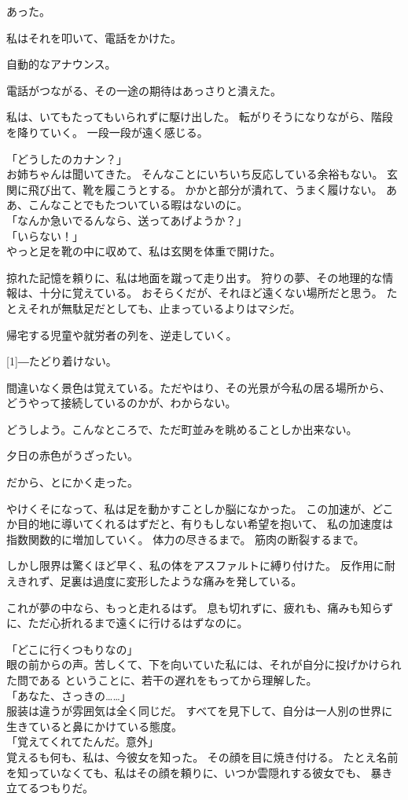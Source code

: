 \documentclass[../IHMain]{subfiles}
\begin{document}
あった。

私はそれを叩いて、電話をかけた。

自動的なアナウンス。

電話がつながる、その一途の期待はあっさりと潰えた。

私は、いてもたってもいられずに駆け出した。
転がりそうになりながら、階段を降りていく。
一段一段が遠く感じる。

「どうしたのカナン？」\\
お姉ちゃんは聞いてきた。
そんなことにいちいち反応している余裕もない。
玄関に飛び出て、靴を履こうとする。
かかと部分が潰れて、うまく履けない。
ああ、こんなことでもたついている暇はないのに。\\
「なんか急いでるんなら、送ってあげようか？」\\
「いらない！」\\
やっと足を靴の中に収めて、私は玄関を体重で開けた。

掠れた記憶を頼りに、私は地面を蹴って走り出す。
狩りの夢、その地理的な情報は、十分に覚えている。
おそらくだが、それほど遠くない場所だと思う。
たとえそれが無駄足だとしても、止まっているよりはマシだ。

帰宅する児童や就労者の列を、逆走していく。

\scalebox{3}[1]{―}たどり着けない。

間違いなく景色は覚えている。ただやはり、その光景が今私の居る場所から、
どうやって接続しているのかが、わからない。

どうしよう。こんなところで、ただ町並みを眺めることしか出来ない。

夕日の赤色がうざったい。

だから、とにかく走った。

やけくそになって、私は足を動かすことしか脳になかった。
この加速が、どこか目的地に導いてくれるはずだと、有りもしない希望を抱いて、
私の加速度は指数関数的に増加していく。
体力の尽きるまで。
筋肉の断裂するまで。

しかし限界は驚くほど早く、私の体をアスファルトに縛り付けた。
反作用に耐えきれず、足裏は過度に変形したような痛みを発している。

これが夢の中なら、もっと走れるはず。
息も切れずに、疲れも、痛みも知らずに、ただ心折れるまで遠くに行けるはずなのに。

「どこに行くつもりなの」\\
眼の前からの声。苦しくて、下を向いていた私には、それが自分に投げかけられた問である
ということに、若干の遅れをもってから理解した。\\
「あなた、さっきの……」\\
服装は違うが雰囲気は全く同じだ。
すべてを見下して、自分は一人別の世界に生きていると鼻にかけている態度。\\
「覚えてくれてたんだ。意外」\\
覚えるも何も、私は、今彼女を知った。
その顔を目に焼き付ける。
たとえ名前を知っていなくても、私はその顔を頼りに、いつか雲隠れする彼女でも、
暴き立てるつもりだ。
\end{document}
